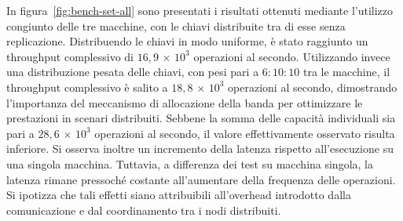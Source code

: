 In figura~\ref{fig:bench-set-all} sono presentati i risultati ottenuti mediante l'utilizzo congiunto delle tre macchine, con le chiavi distribuite tra di esse senza replicazione.
Distribuendo le chiavi in modo uniforme, è stato raggiunto un throughput complessivo di $16{,}9\,{\times}\,10^3$ operazioni al secondo.
Utilizzando invece una distribuzione pesata delle chiavi, con pesi pari a $6{:}10{:}10$ tra le macchine, il throughput complessivo è salito a $18{,}8\,{\times}\,10^3$ operazioni al secondo, dimostrando l'importanza del meccanismo di allocazione della banda per ottimizzare le prestazioni in scenari distribuiti.
Sebbene la somma delle capacità individuali sia pari a $28{,}6\,{\times}\,10^3$ operazioni al secondo, il valore effettivamente osservato risulta inferiore.
Si osserva inoltre un incremento della latenza rispetto all'esecuzione su una singola macchina. Tuttavia, a differenza dei test su macchina singola, la latenza rimane pressoché costante all'aumentare della frequenza delle operazioni.
Si ipotizza che tali effetti siano attribuibili all'overhead introdotto dalla comunicazione e dal coordinamento tra i nodi distribuiti.

